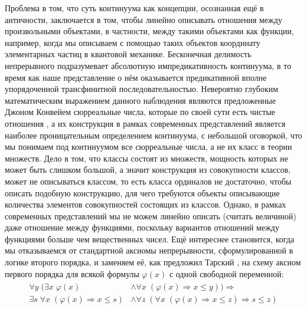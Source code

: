 \documentclass[12pt]{article}
\begin{document}
Проблема в том, что суть континуума как концепции, осознанная ещё в античности, заключается в том, чтобы линейно описывать отношения между произвольными объектами, в частности, между такими объектами как функции, например, когда мы описываем с помощью таких объектов координату элементарных частиц в квантовой механике. Бесконечная делимость непрерывного подразумевает абсолютную импредикативность континуума, в то время как наше представление о нём оказывается предикативной вполне упорядоченной трансфинитной последовательностью. Невероятно глубоким математическим выражением данного наблюдения являются предложенные Джоном Конвейем сюрреальные числа, которые по своей сути есть чистые отношения \cite{conway-surreal-numbers}, а их конструкция в рамках современных представлений является наиболее проницательным определением континуума, с небольшой оговоркой, что мы понимаем под континуумом все сюрреальные числа, а не их класс в теории множеств. Дело в том, что классы состоят из множеств, мощность которых не может быть слишком большой, а значит конструкция из совокупности классов, может не описываться классом, то есть класса ординалов не достаточно, чтобы описать подобную конструкцию, для чего требуются объекты описывающие количества элементов совокупностей состоящих из классов. Однако, в рамках современных представлений мы не можем линейно описать (считать величиной) даже отношение между функциями, поскольку вариантов отношений между функциями больше чем вещественных чисел. Ещё интереснее становится, когда мы отказываемся от стандартной аксиомы непрерывности, сформулированной в логике второго порядка, и заменяем её, как предложил Тарский \cite{tarski-continuity-axiom}, на схему аксиом первого порядка для всякой формулы $\varphi(x)$ с одной свободной переменной: 
\begin{align}
\begin{split}
\forall y \; (\exists x \; \varphi(x) &\wedge \forall x \; (\varphi(x) \Rightarrow x \leq y)) \Rightarrow \\
\exists s \; \forall x \; (\varphi(x) \Rightarrow x \leq s) &\wedge \forall z \; (\forall x \; (\varphi(x) \Rightarrow x \leq z) \Rightarrow s \leq z)
\end{split}
\end{align}
\end{document}
